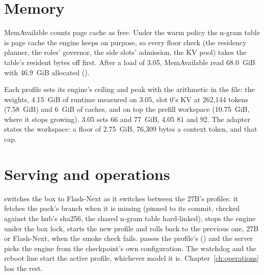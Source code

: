\section{Memory}

MemAvailable counts page cache as free. Under the warm policy the n-gram table is page cache the engine keeps on purpose, so every floor check (the residency planner, the roles' governor, the side slots' admission, the KV pool) takes the table's resident bytes off first. After a load of 3.05, MemAvailable read 68.0~GiB with 46.9~GiB allocated (\measured).

Each profile sets its engine's ceiling and peak with the arithmetic in the file: the weights, 4.15~GiB of runtime measured on 3.05, slot 0's KV at 262,144 tokens (7.58~GiB) and 6~GiB of caches, and on top the prefill workspace (10.75~GiB, where it stops growing). 3.05 sets 66 and 77~GiB, 4.05 81 and 92. The adapter states the workspace: a floor of 2.75~GiB, 76,309 bytes a context token, and that cap.

\section{Serving and operations}

 switches the box to Flash-Next as it switches between the 27B's profiles: it fetches the pack's branch when it is missing (pinned to its commit, checked against the hub's sha256, the shared n-gram table hard-linked), stops the engine under the box lock, starts the new profile and rolls back to the previous one, 27B or Flash-Next, when the smoke check fails.  passes the profile's  () and the server picks the engine from the checkpoint's own configuration. The watchdog and the reboot line start the active profile, whichever model it is. Chapter~\ref{ch:operations} has the rest.

